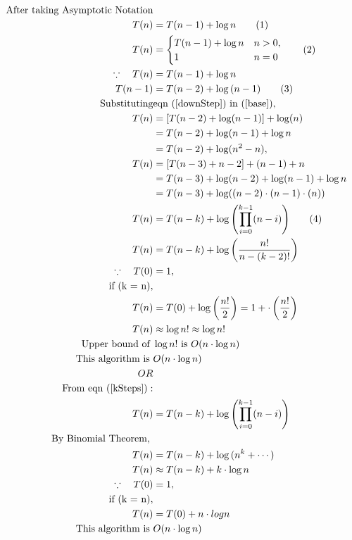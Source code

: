 \documentclass[]{article}
\begin{document}
\begin{align*}
    \text{After taking Asymptotic Notation}\\
    T(n) &= T(n - 1) + \log{n} \tag{1} \label{base}\\
    T(n) &=
    \begin{cases}
        T(n - 1) + \log{n} & n > 0, \\
        1 & n = 0
    \end{cases} \tag{2} \\  
    \because \hspace{10pt} T(n) &= T(n - 1) + \log{n}  \\
    T(n - 1) &= T(n - 2) + \log{(n - 1)} \tag{3} \label{downStep}\\
    \text{Substituting} & \text{eqn } (\ref{downStep}) \text{ in } (\ref{base}),  \\
    T(n)&= [T(n - 2) + \log(n - 1)] + \log(n)\\ 
        &= T(n - 2) + \log(n-1) + \log{n}\\ &= T(n-2) + \log (n^2-n), \\
    T(n)&= [T(n - 3) + n - 2] + (n-1) + n \\
        &= T(n - 3) + \log(n-2) + \log(n-1) + \log n\\
        &= T(n-3) + \log ((n-2) \cdot (n-1) \cdot(n)) \\
    T(n) &= T(n-k) + \log{\left(\prod_{i=0}^{k-1} (n-i) \right)} \label{kSteps} \tag{4}\\
    T(n) &= T(n-k) + \log \left(\frac{n!}{n-(k-2)!}\right)\\
    \because \hspace{10pt} T(0) &= 1, \\
    \text{if (k = n)}, \\
    T(n) &= T(0) + \log \left( \frac{n!}{2}\right) = 1 + \cdot \left( \frac{n!}{2}\right) \\
    T(n) &\approx \log{n!}  \approx \log{n!}\\
    \text{Upper bound of }& \log{n!}  \text{ is }O(n \cdot \log{n})\\
    \text{This algorithm is } & O(n \cdot \log{n})\\
    OR & \\
    \text{From eqn (\ref{kSteps})}:\\
    T(n) &= T(n-k) + \log{\left(\prod_{i=0}^{k-1} (n-i) \right)}\\
    \text{By Binomial Theorem, }\\
    T(n) &= T(n-k) + \log{(n^k + \cdots) }\\
    T(n) &\approx T(n-k) + k \cdot \log {n}\\
    \because \hspace{10pt} T(0) &= 1, \\
    \text{if (k = n)}, \\
    T(n) &= T(0) + n \cdot log{n}\\
    \text{This algorithm is } & O(n \cdot \log{n})
\end{align*}
\end{document}
